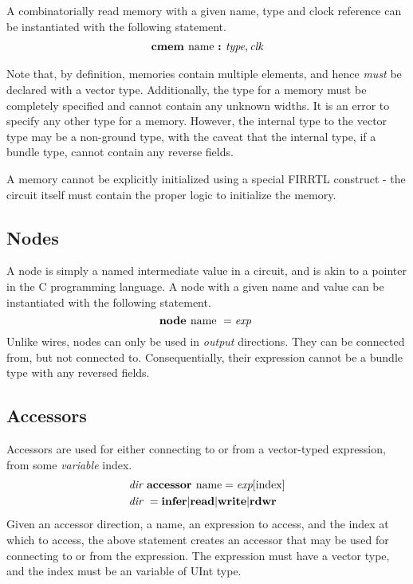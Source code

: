 \documentclass[12pt]{article}
\begin{document}
A combinatorially read memory with a given name, type and clock reference can be instantiated with the following statement.
\[
\begin{aligned}
\text{\bf cmem\ } \text{name } \text{\bf :\ } \text{\em type},\text{\em clk} \\
\end{aligned}
\]

Note that, by definition, memories contain multiple elements, and hence {\em must} be declared with a vector type.
Additionally, the type for a memory must be completely specified and cannot contain any unknown widths.
It is an error to specify any other type for a memory.
However, the internal type to the vector type may be a non-ground type, with the caveat that the internal type, if a bundle type, cannot contain any reverse fields.

A memory cannot be explicitly initialized using a special FIRRTL construct - the circuit itself must contain the proper logic to initialize the memory.

\subsection{Nodes}
A node is simply a named intermediate value in a circuit, and is akin to a pointer in the C programming language.
A node with a given name and value can be instantiated with the following statement.
\[
\text{\bf node\ } \text{name } = \text{\em exp\ } \\
\]
Unlike wires, nodes can only be used in {\em output} directions.
They can be connected from, but not connected to.
Consequentially, their expression cannot be a bundle type with any reversed fields.

\subsection{Accessors}
Accessors are used for either connecting to or from a vector-typed expression, from some {\em variable} index.
\[
\begin{aligned}
&\text{\em dir\ } \text{\bf accessor\ } \text{name} = \text{\em exp}[\text{index}] \\
&\text{\em dir\ }        =     \text{\bf infer} \vert \text{\bf read} \vert \text{\bf write} \vert \text{\bf rdwr\ } \\
\end{aligned}
\]
Given an accessor direction, a name, an expression to access, and the index at which to access, the above statement creates an accessor that may be used for connecting to or from the expression.
The expression must have a vector type, and the index must be an variable of UInt type.
\end{document}
